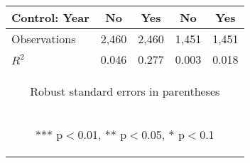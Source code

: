 \begin{center}
\begin{tabular}{lcccc}
Control: Year & No & Yes & No & Yes \\ \hline
Observations & 2,460 & 2,460 & 1,451 & 1,451 \\
 $R^2$ & 0.046 & 0.277 & 0.003 & 0.018 \\ \hline
\multicolumn{5}{c}{\begin{footnotesize} Robust standard errors in parentheses\end{footnotesize}} \\
\multicolumn{5}{c}{\begin{footnotesize} *** p$<$0.01, ** p$<$0.05, * p$<$0.1\end{footnotesize}} \\
\end{tabular}
\end{center}
